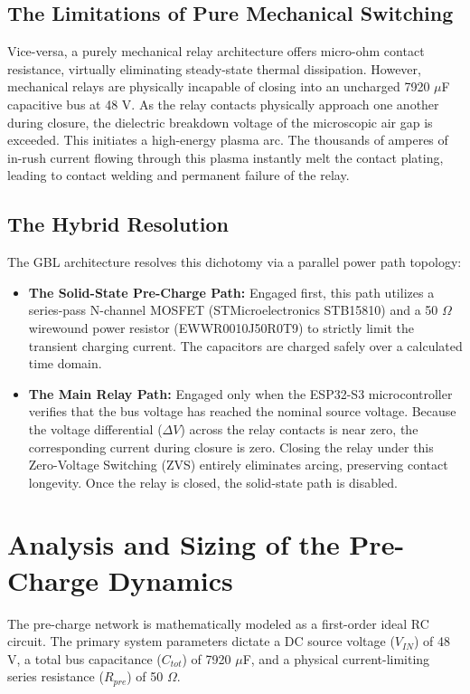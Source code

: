 \documentclass[11pt,a4paper]{article}
\begin{document}
\subsection{The Limitations of Pure Mechanical Switching}
Vice-versa, a purely mechanical relay architecture offers micro-ohm contact resistance, virtually eliminating steady-state thermal dissipation. However, mechanical relays are physically incapable of closing into an uncharged 7920 $\mu$F capacitive bus at 48 V. As the relay contacts physically approach one another during closure, the dielectric breakdown voltage of the microscopic air gap is exceeded. This initiates a high-energy plasma arc. The thousands of amperes of in-rush current flowing through this plasma instantly melt the contact plating, leading to contact welding and permanent failure of the relay.

\subsection{The Hybrid Resolution}
The GBL architecture resolves this dichotomy via a parallel power path topology:
\begin{itemize}
    \item \textbf{The Solid-State Pre-Charge Path:} Engaged first, this path utilizes a series-pass N-channel MOSFET (STMicroelectronics STB15810) and a 50 $\Omega$ wirewound power resistor (EWWR0010J50R0T9) to strictly limit the transient charging current. The capacitors are charged safely over a calculated time domain.
    \item \textbf{The Main Relay Path:} Engaged only when the ESP32-S3 microcontroller verifies that the bus voltage has reached the nominal source voltage. Because the voltage differential ($\Delta V$) across the relay contacts is near zero, the corresponding current during closure is zero. Closing the relay under this Zero-Voltage Switching (ZVS) entirely eliminates arcing, preserving contact longevity. Once the relay is closed, the solid-state path is disabled.
\end{itemize}

\section{Analysis and Sizing of the Pre-Charge Dynamics}

The pre-charge network is mathematically modeled as a first-order ideal RC circuit. The primary system parameters dictate a DC source voltage ($V_{IN}$) of 48 V, a total bus capacitance ($C_{tot}$) of 7920 $\mu$F, and a physical current-limiting series resistance ($R_{pre}$) of 50 $\Omega$.
\end{document}
